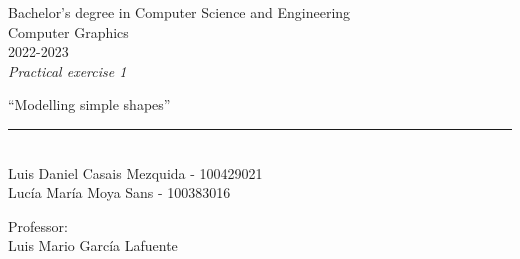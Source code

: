 \begin{titlepage}
	\begin{sffamily}
	\color{azulUC3M}
	\begin{center}
		\begin{figure}[H] %
		\end{figure}
		\vspace{1.5cm}
		\begin{Large}
			Bachelor's degree in Computer Science and Engineering\\
            Computer Graphics\\
			2022-2023\\
			\vspace{2cm}		
			\textsl{Practical exercise 1}
			\bigskip
			
		\end{Large}
		 	{\Huge ``Modelling simple shapes''}\\
		 	\vspace*{0.5cm}
	 		\rule{10.5cm}{0.1mm}\\
			\vspace*{0.9cm}
			{\LARGE Luis Daniel Casais Mezquida - 100429021}\\
			{\LARGE Lucía María Moya Sans - 100383016}\\
			
			\vspace*{1cm}
		\begin{Large}
		    Professor:\\
			Luis Mario García Lafuente\\
		\end{Large}
	\end{center}
	\vfill

	\end{sffamily}
\end{titlepage}